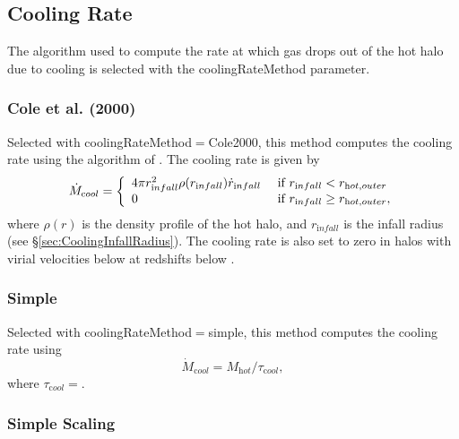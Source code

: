 \subsection{Cooling Rate}\label{sec:CoolingRate}

The algorithm used to compute the rate at which gas drops out of the hot halo due to cooling is selected with the {\normalfont \ttfamily coolingRateMethod} parameter.

\subsubsection{Cole et al. (2000)}

Selected with {\normalfont \ttfamily coolingRateMethod}$=${\normalfont \ttfamily Cole2000}, this method computes the cooling rate using the algorithm of \cite{cole_hierarchical_2000}. The cooling rate is given by
\begin{equation}
\dot{M}_{\mathrm cool} = \left\{ \begin{array}{ll} 4 \pi r_{\mathrm infall}^2 \rho(r_{\mathrm infall}) \dot{r}_{\mathrm infall} & \hbox{ if } r_{\mathrm infall} < r_{\mathrm hot, outer} \\ 0 & \hbox{ if } r_{\mathrm infall} \ge r_{\mathrm hot, outer}, \end{array} \right.
\end{equation}
where $\rho(r)$ is the density profile of the hot halo, and $r_{\mathrm infall}$ is the infall radius (see \S\ref{sec:CoolingInfallRadius}). The cooling rate is also set to zero in halos with virial velocities below {\normalfont \ttfamily [coolingCutOffVelocity]} at redshifts below {\normalfont \ttfamily [coolingCutOffRedshift]}.

\subsubsection{Simple}

Selected with {\normalfont \ttfamily coolingRateMethod}$=${\normalfont \ttfamily simple}, this method computes the cooling rate using
\begin{equation}
\dot{M}_{\mathrm cool} = M_{\mathrm hot}/\tau_{\mathrm cool} ,
\end{equation}
where $\tau_{\mathrm cool}=${\normalfont \ttfamily [coolingRateSimpleTimescale]}.

\subsubsection{Simple Scaling}

